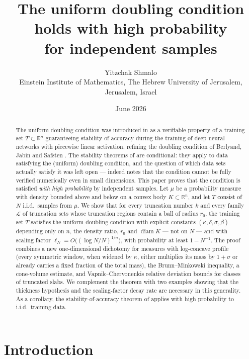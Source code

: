 \documentclass[11pt]{article}
\title{The uniform doubling condition holds with high probability\\for independent samples}
\author{Yitzchak Shmalo\\
\small Einstein Institute of Mathematics, The Hebrew University of Jerusalem, Jerusalem, Israel\\
\small }
\date{June 2026}
\newcommand{\R}{\mathbb{R}}
\newcommand{\diam}{\operatorname{diam}}
\begin{document}
\maketitle

\begin{abstract}
The uniform doubling condition was introduced in \cite{ShmaloUDC} as a verifiable
property of a training set $T\subset\R^n$ guaranteeing stability of accuracy during
the training of deep neural networks with piecewise linear activation, refining the
doubling condition of Berlyand, Jabin and Safsten \cite{BJS}.  The stability theorems
of \cite{BJS,ShmaloUDC} are conditional: they apply to data satisfying the (uniform)
doubling condition, and the question of which data sets actually satisfy it was left
open --- indeed \cite{ShmaloUDC} notes that the condition cannot be fully verified
numerically even in small dimensions.  This paper proves that the condition is
satisfied \emph{with high probability} by independent samples.  Let $\mu$ be a
probability measure with density bounded above and below on a convex body
$K\subset\R^n$, and let $T$ consist of $N$ i.i.d.\ samples from $\mu$.  We show that
for every truncation number $k$ and every family $\mathcal L$ of truncation sets whose
truncation regions contain a ball of radius $r_0$, the training set $T$ satisfies the
uniform doubling condition with explicit constants
$(\kappa,\delta,\sigma,\beta)$ depending only on $n$, the density ratio, $r_0$ and
$\diam K$ --- not on $N$ --- and with scaling factor
$\ell_N=O\bigl((\log N/N)^{1/n}\bigr)$, with probability at least $1-N^{-1}$.  The
proof combines a new one-dimensional dichotomy for measures with log-concave profile
(every symmetric window, when widened by $\kappa$, either multiplies its mass by
$1+\sigma$ or already carries a fixed fraction of the total mass), the
Brunn--Minkowski inequality, a cone-volume estimate, and
Vapnik--Chervonenkis relative deviation bounds for classes of truncated slabs.  We
complement the theorem with two examples showing that the thickness hypothesis and
the scaling-factor decay rate are necessary in this generality.  As a corollary,
the stability-of-accuracy theorem of \cite{ShmaloUDC} applies with high probability
to i.i.d.\ training data.
\end{abstract}

\section{Introduction}\label{sec:intro}
\end{document}

